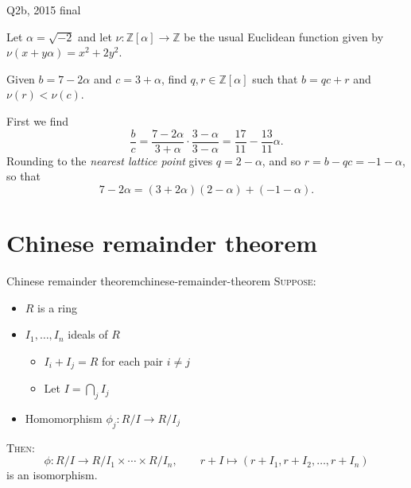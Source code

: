 \begin{problem}{Q2b, 2015 final}{}


    Let $\alpha = \sqrt{-2}$ and let $\nu : \mathbb{Z}[\alpha] \to \mathbb{Z}$ be the usual Euclidean function given by $\nu(x + y \alpha) = x^2 + 2y^2$.

    Given $b = 7 - 2 \alpha$ and $c = 3 + \alpha$, find $q, r \in \mathbb{Z}[\alpha]$ such that $b = qc + r$ and $\nu(r) < \nu(c)$.

    \tcblower

    First we find
        $$ \frac{b}{c} = \frac{7 - 2\alpha}{3 + \alpha} \cdot \frac{3 - \alpha}{3 - \alpha}
            = \frac{17}{11} - \frac{13}{11} \alpha . $$
    Rounding to the \textit{nearest lattice point} gives $q = 2 - \alpha$, and so $r = b - qc = -1 - \alpha$, so that
        $$ 7 - 2 \alpha = (3 + 2 \alpha)(2 - \alpha) + (-1 - \alpha) . $$

\end{problem}

\section{Chinese remainder theorem}

\begin{theorem}{Chinese remainder theorem}{chinese-remainder-theorem}
    \textsc{Suppose}:
        \begin{itemize}
            \item $R$ is a ring
            \item $I_1, \ldots, I_n$ ideals of $R$
                \begin{itemize}
                    \item $I_i + I_j = R$ for each pair $i \neq j$
                    \item Let $I = \bigcap_j I_j$
                \end{itemize}
            \item Homomorphism $\phi_j : R/I \to R/I_j$
        \end{itemize}
    \textsc{Then}:
        $$ \phi : R/I \to R/I_1 \times \cdots \times R/I_n, \qquad
            r + I \mapsto (r + I_1, r + I_2, \ldots, r + I_n) $$
    is an isomorphism.
\end{theorem}